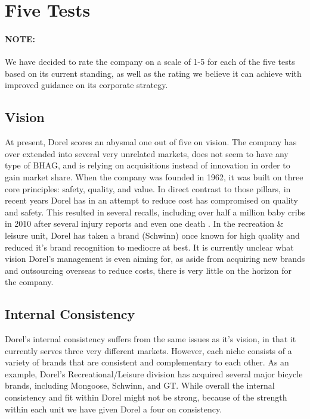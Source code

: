 {%
\section{Five Tests}
\label{chp:tests}
\paragraph{NOTE:}We have decided to rate the company on a scale of 1-5 for each of the five tests based on its current standing, as well as the rating we believe it can achieve with improved guidance on its corporate strategy.



\subsection{Vision}
At present, Dorel scores an abysmal one out of five on vision.  The company has over extended into several very unrelated markets, does not seem to have any type of BHAG, and is relying on acquisitions instead of innovation in order to gain market share.  When the company was founded in 1962, it was built on three core principles: safety, quality, and value.  In direct contrast to those pillars, in recent years Dorel has in an attempt to reduce cost has compromised on quality and safety. This resulted in several recalls, including over half a million baby cribs in 2010 after several injury reports and even one death \cite{Commission2010}.  In the recreation \& leisure unit, Dorel has taken a brand (Schwinn) once known for high quality and reduced it’s brand recognition to mediocre at best.  It is currently unclear what vision Dorel’s management is even aiming for, as aside from acquiring new brands and outsourcing overseas to reduce costs, there is very little on the horizon for the company.  

\subsection{Internal Consistency}
Dorel’s internal consistency suffers from the same issues as it’s vision, in that it currently serves three very different markets.  However, each niche consists of a variety of brands that are consistent and complementary to each other.  As an example, Dorel’s Recreational/Leisure division has acquired several major bicycle brands, including Mongoose, Schwinn, and GT.  While overall the internal consistency and fit within Dorel might not be strong, because of the strength within each unit we have given Dorel a four on consistency.

}
